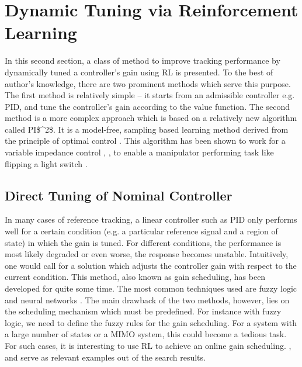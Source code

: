 \section{Dynamic Tuning via Reinforcement Learning} \label{sec:dytun}
In this second section, a class of method to improve tracking performance by dynamically tuned a controller's gain using \acs {RL} is presented. To the best of author's knowledge, there are two prominent methods which serve this purpose. The first method is relatively simple -- it starts from an admissible controller e.g. \ac{PID}, and tune the controller's gain according to the value function. The second method is a more complex approach which is based on a relatively new algorithm called \acs {PI$^2$}. It is a model-free, sampling based learning method derived from the principle of optimal control \cite{Buchli2010}. This algorithm has been shown to work for a variable impedance control \cite{Buchli6037312}, \cite{buchli2011learning}, \cite{theodorou2010generalized} to enable a manipulator performing task like flipping a light switch \cite{buchli2011learning}.

\subsection{Direct Tuning of Nominal Controller}
In many cases of reference tracking, a linear controller such as \acs{PID} only performs well for a certain condition (e.g. a particular reference signal and a region of state) in which the gain is tuned. For different conditions, the performance is most likely degraded or even worse, the response becomes unstable. Intuitively, one would call for a solution which adjusts the controller gain with respect to the current condition. This method, also known as gain scheduling, has been developed for quite some time. The most common techniques used are fuzzy logic \cite{375142} \cite{5229855} \cite{1684589} and neural networks \cite{6606304} \cite{572744} \cite{556252}. The main drawback of the two methods, however, lies on the scheduling mechanism which must be predefined. For instance with fuzzy logic, we need to define the fuzzy rules for the gain scheduling. For a system with a large number of states or a \ac {MIMO} system, this could become a tedious task. For such cases, it is interesting to use \acs {RL} to achieve an online gain scheduling. \cite{882916}, \cite{856947} and \cite{Brujeni5669655} serve as relevant examples out of the search results.

